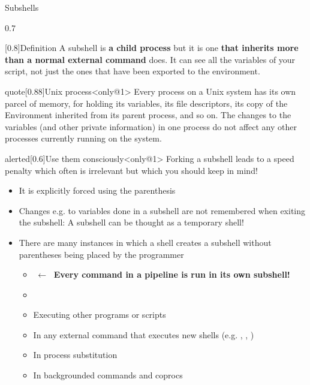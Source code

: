 \begin{frame}{Subshells}
    \vspace{-4mm}
    \begin{overlayarea}{\textwidth}{0.7\textheight}
        \begin{varblock}{}[0.8\textwidth]{Definition}
            A subshell is \textbf{a child process} but it is one \textbf{that inherits more than a normal external command} does.
            It can see all the variables of your script, not just the ones that have been exported to the environment.
        \end{varblock}
        \begin{varblock}{quote}[0.88\textwidth]{Unix process}<only@1>
            Every process on a Unix system has its own parcel of memory, for holding its variables, its file descriptors, its copy of the Environment inherited from its parent process, and so on.
            The changes to the variables (and other private information) in one process do not affect any other processes currently running on the system.
        \end{varblock}
        \begin{varblock}{alerted}[0.6\textwidth]{Use them consciously}<only@1>
            Forking a subshell leads to a speed penalty which often is irrelevant but which you should keep in mind!
        \end{varblock}
        \begin{itemize}[<2>]
            \item It is explicitly forced using the parenthesis \PB{\texttt{(\ldots)}}
            \item Changes e.g. to variables done in a subshell are not remembered when exiting the subshell: A subshell can be thought as a temporary shell!
            \item There are many instances in which a shell creates a subshell without parentheses being placed by the programmer
                  \begin{itemize}
                      \item {} $\;\longleftarrow\;$ \alert{\textbf{Every command in a pipeline is run in its own subshell!}}
                      \item {}
                      \item Executing other programs or scripts
                      \item In any external command that executes new shells (e.g. , , )
                      \item In process substitution
                      \item In backgrounded commands and coprocs
                  \end{itemize}
        \end{itemize}
    \end{overlayarea}
\end{frame}
